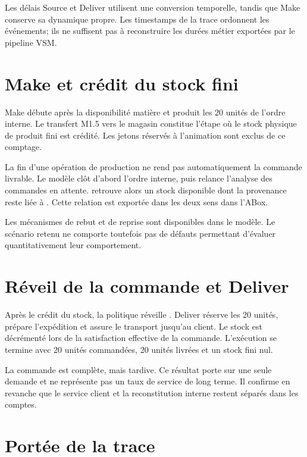 Les délais Source et Deliver utilisent une conversion temporelle, tandis que Make conserve sa dynamique propre. Les timestamps de la trace ordonnent les événements; ils ne suffisent pas à reconstruire les durées métier exportées par le pipeline VSM.

\section{Make et crédit du stock fini}

Make débute après la disponibilité matière et produit les 20 unités de l'ordre interne. Le transfert M1.5 vers le magasin constitue l'étape où le stock physique de produit fini est crédité. Les jetons réservés à l'animation sont exclus de ce comptage.

La fin d'une opération de production ne rend pas automatiquement la commande livrable. Le modèle clôt d'abord l'ordre interne, puis relance l'analyse des commandes en attente.  retrouve alors un stock disponible dont la provenance reste liée à . Cette relation est exportée dans les deux sens dans l'ABox.

Les mécanismes de rebut et de reprise sont disponibles dans le modèle. Le scénario retenu ne comporte toutefois pas de défauts permettant d'évaluer quantitativement leur comportement.

\section{Réveil de la commande et Deliver}

Après le crédit du stock, la politique réveille . Deliver réserve les 20 unités, prépare l'expédition et assure le transport jusqu'au client. Le stock est décrémenté lors de la satisfaction effective de la commande. L'exécution se termine avec 20 unités commandées, 20 unités livrées et un stock fini nul.

La commande est complète, mais tardive. Ce résultat porte sur une seule demande et ne représente pas un taux de service de long terme. Il confirme en revanche que le service client et la reconstitution interne restent séparés dans les comptes.


\section{Portée de la trace}

